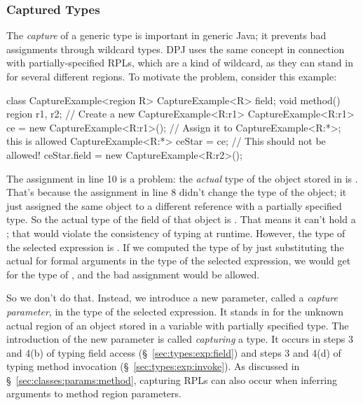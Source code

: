 \subsubsection{Captured Types%
\label{sec:types:exp:capture}}

The \emph{capture} of a generic type is important in generic Java; it
prevents bad assignments through wildcard types.  DPJ uses the same
concept in connection with partially-specified RPLs, which are a kind
of wildcard, as they can stand in for several different regions.  To
motivate the problem, consider this example:
%
\begin{numbereddpjlisting}
class CaptureExample<region R> {
    CaptureExample<R> field;
    void method() {
        region r1, r2;
        // Create a new CaptureExample<R:r1>
        CaptureExample<R:r1> ce = new CaptureExample<R:r1>();
        // Assign it to CaptureExample<R:*>; this is allowed
        CaptureExample<R:*> ceStar = ce;
        // This should not be allowed!
        ceStar.field = new CaptureExample<R:r2>();
    }
}
\end{numbereddpjlisting}
%
The assignment in line 10 is a problem: the \emph{actual} type of the
object stored in  is .  That's
because the assignment in line 8 didn't change the type of the object;
it just assigned the same object to a different reference with a
partially specified type.  So the actual type of the  field
of that object is .  That means it can't
hold a ; that would violate the consistency
of typing at runtime.  However, the type of the selected expression
 is .  If we computed the type of
 by just substituting the actual for formal
arguments in the type of the selected expression, we would get
 for the type of , and the
bad assignment would be allowed.

So we don't do that.  Instead, we introduce a new parameter, called a
\emph{capture parameter}, in the type of the selected expression.  It
stands in for the unknown actual region of an object stored in a
variable with partially specified type.  The introduction of the new
parameter is called \emph{capturing} a type.  It occurs in steps 3 and
4(b) of typing field access (\S~\ref{sec:types:exp:field}) and steps 3
and 4(d) of typing method invocation (\S~\ref{sec:types:exp:invoke}).
As discussed in \S~\ref{sec:classes:params:method}, capturing RPLs can
also occur when inferring arguments to method region parameters.

